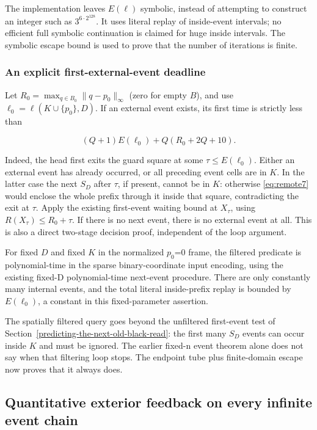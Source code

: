 \documentclass[
  11pt,
]{article}
\begin{document}
The implementation leaves \(E(\ell)\) symbolic, instead of attempting to
construct an integer such as $3^{6\cdot2^{128}}$. It uses literal replay
of inside-event intervals; no efficient full symbolic continuation is
claimed for huge inside intervals. The symbolic escape bound is used to
prove that the number of iterations is finite.

\subsubsection{An explicit first-external-event
deadline}\label{an-explicit-first-external-event-deadline}

Let $R_0=\max_{q\in B_0}\|q-p_0\|_\infty$
(zero for empty \(B\)), and use $\ell_0=\ell(K\cup\{p_0\},D)$. If an
external event exists, its first time is strictly less than

\begin{equation}\label{eq:remote10a}
(Q+1)E(\ell_0)+Q(R_0+2Q+10).
\end{equation}

Indeed, the head first exits the guard square at some
$\tau\le E(\ell_0)$. Either an external event has already occurred,
or all preceding event cells are in \(K\). In the latter case the next $S_D$
after \(\tau\), if present, cannot be in \(K\): otherwise \eqref{eq:remote7} would enclose
the whole prefix through it inside that square, contradicting the exit
at \(\tau\). Apply the existing first-event waiting bound at $X_\tau$, using
$R(X_\tau)\le R_0+\tau$. If there is no next event, there is no
external event at all. This is also a direct two-stage decision proof,
independent of the loop argument.

For fixed \(D\) and fixed \(K\) in the normalized $p_0$=0 frame, the filtered
predicate is polynomial-time in the sparse binary-coordinate input
encoding, using the existing fixed-D polynomial-time next-event
procedure. There are only constantly many internal events, and the total
literal inside-prefix replay is bounded by $E(\ell_0)$, a constant in this
fixed-parameter assertion.

The spatially filtered query goes beyond the unfiltered first-event test of
Section~\ref{predicting-the-next-old-black-read}: the first many $S_D$
events can occur inside \(K\) and must be ignored. The earlier fixed-n event
theorem alone does not say when that filtering loop stops. The endpoint
tube plus finite-domain escape now proves that it always does.

\subsection{Quantitative exterior feedback on every infinite event
chain}\label{remote-6}
\end{document}
